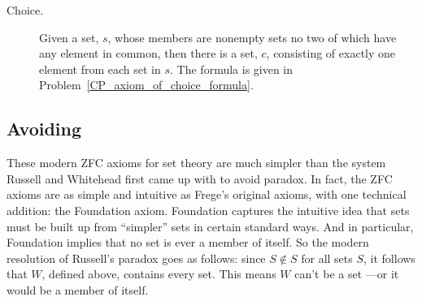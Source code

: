 \begin{description}
\iffalse  %
For every non-empty set, $x$, there is a set $y \in x$
  such that $x$ and $y$ have no elements in common.  
\fi

\item[Choice.]  Given a set, $s$, whose members
  are nonempty sets no two of which have any element in common, then
  there is a set, $c$, consisting of exactly one element from each set
  in $s$.  The formula is given in
  Problem~\ref{CP_axiom_of_choice_formula}.

\iffalse

\begin{tabbing}
$\exists y \, \forall z \, \forall w \,
 \biggl( ($\=$z \in w \,\QAND\, w \in x) \; \QIMPLIES $\\
\> $\exists v \, \exists u \, \Bigl(\exists t \, \bigr((u \in w \, \QAND \, w \in t)$\=$\;\QAND\; (u \in t \,\QAND\, t \in y)\bigl) $\\
\> \> $\QIFF\; u = v\Bigr) \biggr)$
\end{tabbing}

\[\begin{array}{rlll}
\exists y \forall z \forall w & ( (z \in w \QAND w \in x) \QIMPLIES\\
                              &\quad \exists v \exists u (\exists t
                                           ((u \in w \QAND & w \in t)
                                                              & \QAND (u \in t \QAND t \in y))\\
                                                            &&& \QIFF u = v))
\end{array}\]

\fi
\end{description}


\subsection{Avoiding }

These modern ZFC axioms for set theory are much simpler than the system
Russell and Whitehead first came up with to avoid paradox.  In fact, the
ZFC axioms are as simple and intuitive as Frege's original axioms, with
one technical addition: the Foundation axiom.  Foundation captures the
intuitive idea that sets must be built up from ``simpler'' sets in certain
standard ways.  And in particular, Foundation implies that no set is ever
a member of itself.  So the modern resolution of Russell's paradox goes as
follows: since $S \not \in S$ for all sets $S$, it follows that $W$,
defined above, contains every set.  This means $W$ can't be a set ---or it
would be a member of itself.

